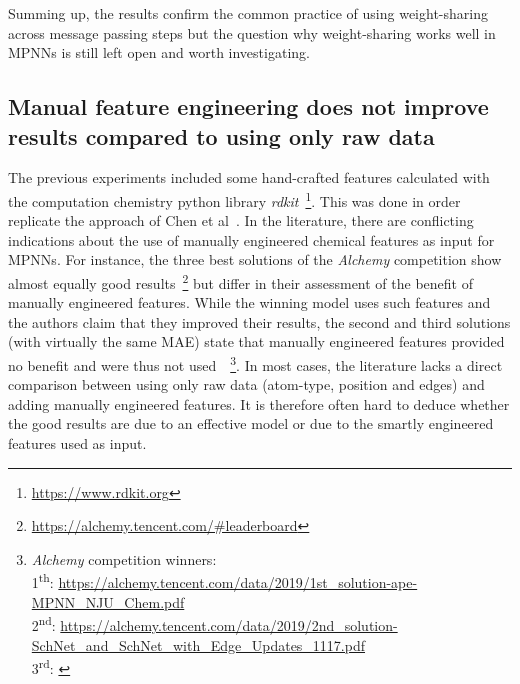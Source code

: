 Summing up, the results confirm the common practice of using weight-sharing across message passing steps but the question why weight-sharing works well in MPNNs is still left open and worth investigating.


\subsection{Manual feature engineering does not improve results compared to using only raw data}
\label{sec:raw-data}

The previous experiments included some hand-crafted features calculated with the computation chemistry python library \textit{rdkit}~\footnote{\url{https://www.rdkit.org}}. This was done in order replicate the approach of Chen et al~\cite{Chen2019}. In the literature, there are conflicting indications about the use of manually engineered chemical features as input for MPNNs. For instance, the three best solutions of the \textit{Alchemy} competition show almost equally good results~\footnote{\url{https://alchemy.tencent.com/\#leaderboard}} but differ in their assessment of the benefit of manually engineered features. While the winning model uses such features and the authors claim that they improved their results, the second and third solutions (with virtually the same MAE) state that manually engineered features provided no benefit and were thus not used~\cite{Klicpera2019}~\footnote{
\textit{Alchemy} competition winners: \\
	1\textsuperscript{th}: \url{https://alchemy.tencent.com/data/2019/1st_solution-ape-MPNN_NJU_Chem.pdf} \\
	2\textsuperscript{nd}: \url{https://alchemy.tencent.com/data/2019/2nd_solution-SchNet_and_SchNet_with_Edge_Updates_1117.pdf}\\
	3\textsuperscript{rd}: \cite{Klicpera2019}
}.
In most cases, the literature lacks a direct comparison between using only raw data (atom-type, position and edges) and adding manually engineered features. It is therefore often hard to deduce whether the good results are due to an effective model or due to the smartly engineered features used as input.


